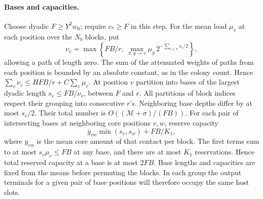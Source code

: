 \paragraph{Bases and capacities.}
Choose dyadic $F\ge Y^2w_0$; require $c_*\ge F$ in this step. For the mean load \(\mu_v\) at each position over the \(N_b\) blocks, put
\[
 \nu_v=\max\left\{ FB/r,\ 
      \max_{\pi:y\to v} \mu_y\,2^{-\sum_{e\in\pi}s_e/2}\right\},
\]
allowing a path of length zero. The sum of the attenuated weights of paths from each position is bounded by an absolute constant, as in the colony count. Hence \(\sum_v\nu_v\le HFB/r+C\sum_v\mu_v\). At position \(v\) partition into bases of the largest dyadic length \(s_v\le FB/\nu_v\), between \(F\) and \(r\). All partitions of block indices respect their grouping into consecutive $r$'s. Neighboring base depths differ by at most \(s_e/2\). Their total number is \(O((\mathcal M+\sigma)/(FB))\). For each pair of intersecting bases at neighboring core positions \(v,w\), reserve capacity
\[
 \overline y_{vw}\min(s_v,s_w)+FB/K_1 ,
\]
where \(\overline y_{vw}\) is the mean core amount of that contact per block. The first terms sum to at most \(s_v\mu_v\le FB\) at any base, and there are at most \(K_1\) reservations. Hence total reserved capacity at a base is at most \(2FB\). Base lengths and capacities are fixed from the means before permuting the blocks. In each group the output terminals for a given pair of base positions will therefore occupy the same host slots.

